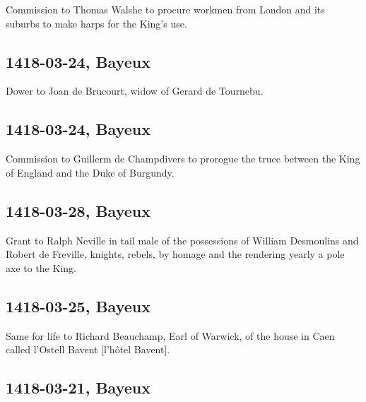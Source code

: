 \documentclass[a4paper,12pt,twoside]{book}
\begin{document}
                
                  Commission to Thomas Walshe to procure workmen from London and its suburbs to make harps for the King's use.
               
                
                \subsection{1418-03-24, Bayeux}
                
                
                  Dower to Joan de Brucourt, widow of Gerard de Tournebu.
               
                
                \subsection{1418-03-24, Bayeux}
                
                
                  Commission to Guillerm de Champdivers to prorogue the truce between the King of England and the Duke of Burgundy.
               
                
                \subsection{1418-03-28, Bayeux}
                
                
                  Grant to Ralph Neville in tail male of the possessions of William Desmoulins and Robert de Freville, knights, rebels, by homage and the rendering yearly a pole axe to the King.
               
                
                \subsection{1418-03-25, Bayeux}
                
                
                  Same for life to Richard Beauchamp, Earl of Warwick, of the house in Caen called l'Ostell Bavent [l’hôtel Bavent].
               
                
                \subsection{1418-03-21, Bayeux}
                
\end{document}
